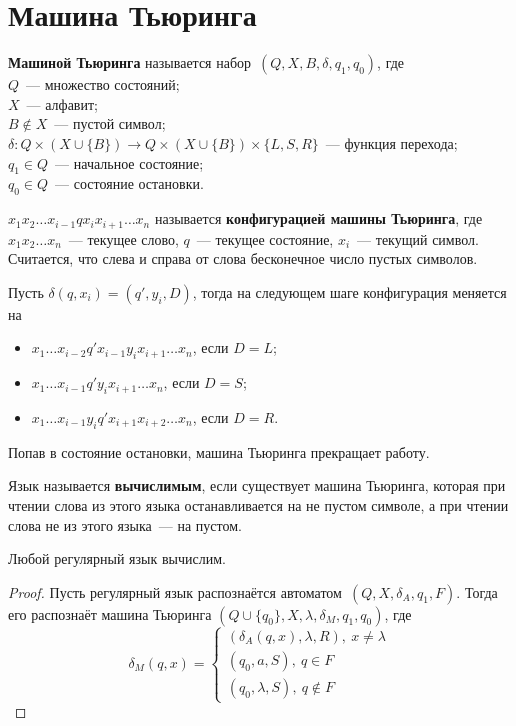\section{Машина Тьюринга}
 \textbf{Машиной Тьюринга} называется набор~$(Q, X, B, \delta, q_1, q_0)$, где\\
$Q$~--- множество состояний;\\
$X$~--- алфавит;\\
$B \notin X$~--- пустой символ;\\
$\delta \colon Q \times (X \cup \{ B \}) \to Q \times (X \cup \{ B \}) \times \{ L, S, R \}$~--- функция перехода;\\
$q_1 \in Q$~--- начальное состояние;\\
$q_0 \in Q$~--- состояние остановки.

$x_1 x_2 \ldots x_{i-1} q x_i x_{i+1} \ldots x_n$ называется \textbf{конфигурацией машины Тьюринга}, где $x_1 x_2 \ldots x_n$~--- текущее слово, $q$~--- текущее состояние, $x_i$~--- текущий символ.
Считается, что слева и справа от слова бесконечное число пустых символов.

Пусть $\delta(q, x_i) = (q', y_i, D)$, тогда на следующем шаге конфигурация меняется на
\begin{itemize}
	\item $x_1 \ldots x_{i-2} q' x_{i-1} y_i x_{i+1} \ldots x_n$, если $D = L$;
	\item $x_1 \ldots x_{i-1} q' y_i x_{i+1} \ldots x_n$, если $D = S$;
	\item $x_1 \ldots x_{i-1} y_i q' x_{i+1} x_{i+2} \ldots x_n$, если $D = R$.
\end{itemize}

Попав в состояние остановки, машина Тьюринга прекращает работу.

 Язык называется \textbf{вычислимым}, если существует машина Тьюринга, которая при чтении слова из этого языка останавливается на не пустом символе, а при чтении слова не из этого языка~--- на пустом.

\begin{theorem}
Любой регулярный язык вычислим.
\end{theorem}
\begin{proof}
Пусть регулярный язык распознаётся автоматом~$(Q, X, \delta_A, q_1, F)$.
Тогда его распознаёт машина Тьюринга $(Q \cup \{ q_0 \}, X, \lambda, \delta_M, q_1, q_0)$, где
\begin{equation*}
\delta_M(q, x) =
\begin{cases}
(\delta_A(q, x), \lambda, R), \ x \neq \lambda \\
(q_0, a, S), \ q \in F \\
(q_0, \lambda, S), \ q \notin F
\end{cases}
\end{equation*}
\end{proof}


